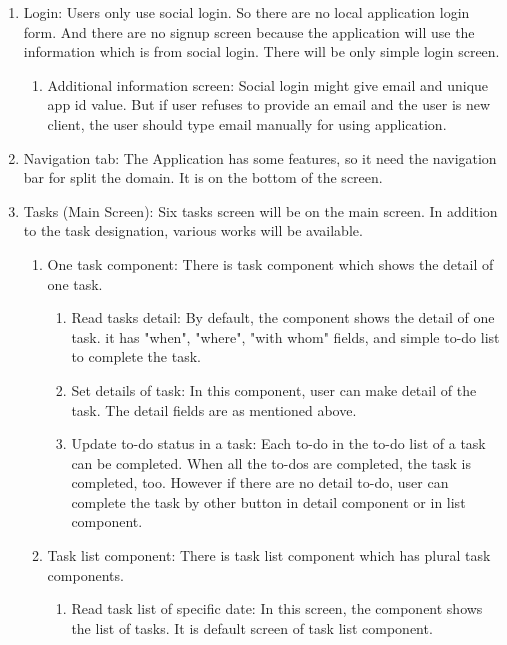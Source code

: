 \documentclass[conference]{IEEEtran}
\begin{document}
\begin{enumerate}
    \item Login: Users only use social login. So there are no local application login form. And there are no signup screen because the application will use the information which is from social login. There will be only simple login screen.
    \begin{enumerate}
        \item Additional information screen: Social login might give email and unique app id value. But if user refuses to provide an email and the user is new client, the user should type email manually for using application.\\
    \end{enumerate}
    \item Navigation tab: The Application has some features, so it need the navigation bar for split the domain. It is on the bottom of the screen.\\
    \item Tasks (Main Screen): Six tasks screen will be on the main screen. In addition to the task designation, various works will be available.
    \begin{enumerate}
        \item One task component: There is task component which shows the detail of one task.
        \begin{enumerate}
            \item Read tasks detail: By default, the component shows the detail of one task. it has "when", "where", "with whom" fields, and simple to-do list to complete the task.
            \item Set details of task: In this component, user can make detail of the task. The detail fields are as mentioned above.
            \item Update to-do status in a task: Each to-do in the to-do list of a task can be completed. When all the to-dos are completed, the task is completed, too. However if there are no detail to-do, user can complete the task by other button in detail component or in list component. \\
        \end{enumerate}
        \item Task list component: There is task list component which has plural task components.
        \begin{enumerate}
            \item Read task list of specific date: In this screen, the component shows the list of tasks. It is default screen of task list component.

\end{enumerate}
\end{enumerate}
\end{enumerate}
\end{document}
